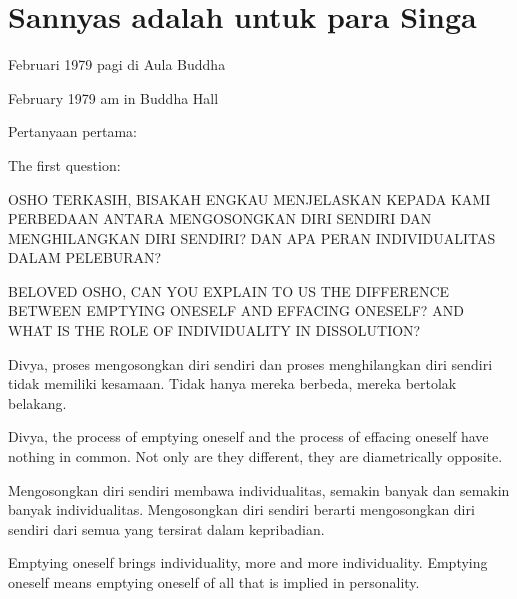 \chapter{Sannyas adalah untuk para Singa} %

 Februari 1979 pagi di Aula Buddha

 February 1979 am in Buddha Hall

\bahasa
Pertanyaan pertama:

\english
The first question:

\bahasa
OSHO TERKASIH,
BISAKAH ENGKAU MENJELASKAN KEPADA KAMI PERBEDAAN ANTARA MENGOSONGKAN DIRI SENDIRI DAN MENGHILANGKAN DIRI SENDIRI? DAN APA PERAN INDIVIDUALITAS DALAM PELEBURAN?

\english
BELOVED OSHO,
CAN YOU EXPLAIN TO US THE DIFFERENCE BETWEEN EMPTYING ONESELF AND EFFACING ONESELF? AND WHAT IS THE ROLE OF INDIVIDUALITY IN DISSOLUTION?

\bahasa
Divya, proses mengosongkan diri sendiri dan proses menghilangkan diri sendiri tidak memiliki kesamaan. Tidak hanya mereka berbeda, mereka bertolak belakang.

\english
Divya, the process of emptying oneself and the process of effacing oneself have nothing in common. Not only are they different, they are diametrically opposite.

\bahasa
Mengosongkan diri sendiri membawa individualitas, semakin banyak dan semakin banyak individualitas. Mengosongkan diri sendiri berarti mengosongkan diri sendiri dari semua yang tersirat dalam kepribadian.

\english
Emptying oneself brings individuality, more and more individuality. Emptying oneself means emptying oneself of all that is implied in personality.

